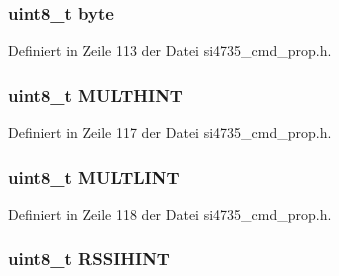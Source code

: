 \subsubsection[{byte}]{\setlength{\rightskip}{0pt plus 5cm}uint8\+\_\+t byte}\label{unionfm__rsq__status__resp1_a96f44d20f1dbf1c8785a7bc99a46164c}


Definiert in Zeile 113 der Datei si4735\+\_\+cmd\+\_\+prop.\+h.

\hypertarget{unionfm__rsq__status__resp1_aad2227d372dbc81eb060b01d2e985806}{}
\subsubsection[{M\+U\+L\+T\+H\+I\+N\+T}]{\setlength{\rightskip}{0pt plus 5cm}uint8\+\_\+t M\+U\+L\+T\+H\+I\+N\+T}\label{unionfm__rsq__status__resp1_aad2227d372dbc81eb060b01d2e985806}


Definiert in Zeile 117 der Datei si4735\+\_\+cmd\+\_\+prop.\+h.

\hypertarget{unionfm__rsq__status__resp1_a794b7b3c9ce09a60905ee23ab161a6b0}{}
\subsubsection[{M\+U\+L\+T\+L\+I\+N\+T}]{\setlength{\rightskip}{0pt plus 5cm}uint8\+\_\+t M\+U\+L\+T\+L\+I\+N\+T}\label{unionfm__rsq__status__resp1_a794b7b3c9ce09a60905ee23ab161a6b0}


Definiert in Zeile 118 der Datei si4735\+\_\+cmd\+\_\+prop.\+h.

\hypertarget{unionfm__rsq__status__resp1_a3f94db5fbbe3d52c506832d6a29885d1}{}
\subsubsection[{R\+S\+S\+I\+H\+I\+N\+T}]{\setlength{\rightskip}{0pt plus 5cm}uint8\+\_\+t R\+S\+S\+I\+H\+I\+N\+T}\label{unionfm__rsq__status__resp1_a3f94db5fbbe3d52c506832d6a29885d1}


